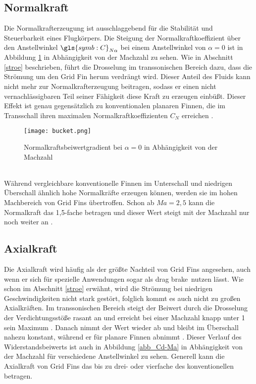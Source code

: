\subsection{Normalkraft}
Die Normalkrafterzeugung ist ausschlaggebend für die Stabilität und Steuerbarkeit eines Flugkörpers. Die Steigung der Normalkraftkoeffizient über den Anstellwinkel $\gls{symb:C}_{N\alpha}$ bei einem Anstellwinkel von $\alpha = 0$ ist in Abbildung \ref{abb_bucket} in Abhängigkeit von der Machzahl zu sehen. Wie in Abschnitt \ref{stroe} beschrieben, führt die Drosselung im transsonischen Bereich dazu, dass die Strömung um den Grid Fin herum verdrängt wird. Dieser Anteil des Fluids kann nicht mehr zur Normalkrafterzeugung beitragen, sodass er einen nicht vernachlässigbaren Teil seiner Fähigkeit diese Kraft zu erzeugen einbüßt. Dieser Effekt ist genau gegensätzlich zu konventionalen planaren Finnen, die im Transschall ihren maximalen Normalkraftkoeffizienten $C_N$ erreichen \cite{synopsis}.
\begin{figure}[h]
	\centering
	\texttt{[image: bucket.png]}
	\begin{flushright}
	\end{flushright}
	\caption{Normalkraftsbeiwertgradient bei $\alpha = 0$ in Abhängigkeit von der Machzahl}
	\label{abb_bucket}
\end{figure}\\
Während vergleichbare konventionelle Finnen im Unterschall und niedrigen Überschall ähnlich hohe Normalkräfte erzeugen können, werden sie im hohen Machbereich von Grid Fins übertroffen. Schon ab $Ma=2,5$ kann die Normalkraft das 1,5-fache betragen und dieser Wert steigt mit der Machzahl nur noch weiter an \cite{synopsis,vergleichPlanarNATO}.
\subsection{Axialkraft}
Die Axialkraft wird häufig als der größte Nachteil von Grid Fins angesehen, auch wenn er sich für spezielle Anwendungen sogar als \grqq drag brake\grqq \ nutzen lässt. Wie schon im Abschnitt \ref{stroe} erwähnt, wird die Strömung bei niedrigen Geschwindigkeiten nicht stark gestört, folglich kommt es auch nicht zu großen Axialkräften. Im transsonischen Bereich steigt der Beiwert durch die Drosselung der Verdichtungsstöße rasant an und erreicht bei einer Machzahl knapp unter 1 sein Maximum \cite{solver}. Danach nimmt der Wert wieder ab und bleibt im Überschall nahezu konstant, während er für planare Finnen abnimmt \cite{vergleichPlanarNATO}. Dieser Verlauf des Widerstandsbeiwerts ist auch in Abbildung \ref{abb_Cd-Ma} in Abhängigkeit von der Machzahl für verschiedene Anstellwinkel zu sehen. Generell kann die Axialkraft von Grid Fins das bis zu drei- oder  vierfache des konventionellen betragen.
